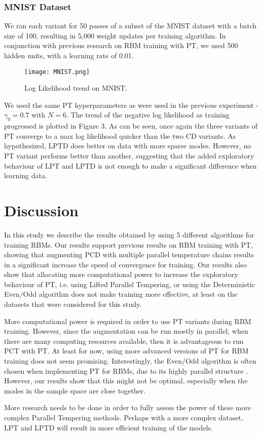 \subsubsection{MNIST Dataset}
We ran each variant for 50 passes of a subset of the MNIST dataset with a batch size of 100, resulting in 5,000 weight updates per training algorithm. In conjunction with previous research on RBM training with PT, we used 500 hidden units, with a learning rate of 0.01\cite{desjardins2010tempered}. 

\begin{figure}[ht!]
	\centering
	\texttt{[image: MNIST.png]}
\caption{Log Likelihood trend on MNIST.}
\end{figure}

We used the same PT hyperparameters as were used in the previous experiment - $\gamma_0 = 0.7$ with $N=6$. The trend of the negative log likelihood as training progressed is plotted in Figure 3. As can be seen, once again the three variants of PT converge to a max log likelihood quicker than the two CD variants. As hypothesized, LPTD does better on data with more sparse modes. However, no PT variant performs better than another, suggesting that the added exploratory behaviour of LPT and LPTD is not enough to make a significant difference when learning data.  

\section{Discussion}
In this study we describe the results obtained by using 5 different algorithms for training RBMs. Our results support previous results on RBM training with PT, showing that augmenting PCD with multiple parallel temperature chains results in a significant increase the speed of convergence for training. Our results also show that allocating more computational power to increase the exploratory behaviour of PT, i.e. using Lifted Parallel Tempering, or using the Deterministic Even/Odd algorithm does not make training more effective, at least on the datasets that were considered for this study.

More computational power is required in order to use PT variants during RBM training. However, since the augmentation can be run mostly in parallel, when there are many computing resources available, then it is advantageous to run PCT with PT. At least for now, using more advanced versions of PT for RBM training does not seem promising. Interestingly, the Even/Odd algorithm is often chosen when implementing PT for RBMs, due to its highly parallel structure \cite{fischer2014training}. However, our results show that this might not be optimal, especially when the modes in the sample space are close together.

More research needs to be done in order to fully assess the power of these more complex Parallel Tempering methods. Perhaps with a more complex dataset, LPT and LPTD will result in more efficient training of the models. \\